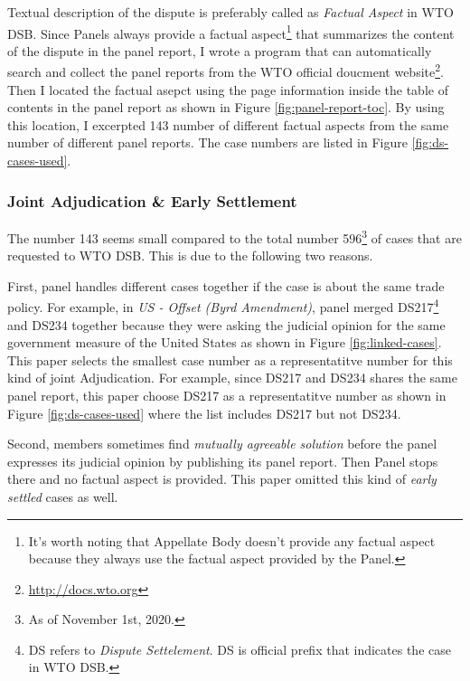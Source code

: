 Textual description of the dispute is preferably called as
\textit{Factual Aspect} in WTO DSB. 
Since Panels
always provide a factual aspect\footnote{
    It's worth noting that Appellate Body doesn't provide any factual aspect because they always use the factual aspect provided by the Panel.
}
that summarizes the content of the dispute
in the panel report, %
I wrote a program that can 
automatically search and collect 
the panel reports from the WTO official doucment website\footnote{
    \url{http://docs.wto.org}
}.
Then I located the factual asepct using the page information inside the 
table of contents in the panel report as shown in Figure \ref{fig:panel-report-toc}.
By using this location, I excerpted 143 number of different factual aspects from the same number of different panel reports. The case numbers are listed in Figure \ref{fig:ds-cases-used}.

\subsubsection{Joint Adjudication \& Early Settlement}

The number 143 seems small compared to the total number 596\footnote
{As of November 1st, 2020.} of cases that are requested to WTO DSB. This is due to the following two reasons. 

First, panel handles different cases together if the case is about the
same trade policy. For example, in \textit{US - Offset (Byrd Amendment)}, panel merged DS217\footnote{
    DS refers to \textit{Dispute Settelement}. DS is official prefix that indicates the case in WTO DSB.
} and DS234 together because they were asking the judicial opinion for the same government measure of the United States as shown in Figure \ref{fig:linked-cases}. 
This paper selects the smallest case number as a representatitve number for this kind of joint Adjudication. 
For example, since DS217 and DS234 shares the same panel report, this paper choose DS217 as a representatitve number as shown in Figure \ref{fig:ds-cases-used} where the list includes DS217 but not DS234.

Second, members sometimes find \textit{mutually agreeable solution} before the panel expresses its judicial opinion by publishing its panel report. Then Panel stops there and no factual aspect is provided. This paper omitted this kind of \textit{early settled} cases as well.

 

